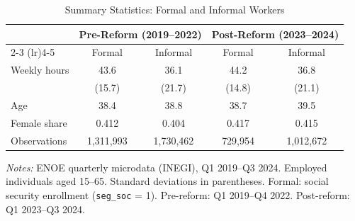 \begin{table}[t]
\centering
\caption{Summary Statistics: Formal and Informal Workers}
\label{tab:summary}
\small
\begin{tabular}{lcccc}
  \toprule
  & \multicolumn{2}{c}{Pre-Reform (2019--2022)} & \multicolumn{2}{c}{Post-Reform (2023--2024)} \\
  \cmidrule(lr){2-3} \cmidrule(lr){4-5}
  & Formal & Informal & Formal & Informal \\
  \midrule
  Weekly hours & 43.6 & 36.1 & 44.2 & 36.8 \\
  & (15.7) & (21.7) & (14.8) & (21.1) \\
  Age & 38.4 & 38.8 & 38.7 & 39.5 \\
  Female share & 0.412 & 0.404 & 0.417 & 0.415 \\
  \midrule
  Observations & 1,311,993 & 1,730,462 & 729,954 & 1,012,672 \\
  \bottomrule
\end{tabular}
\begin{tablenotes}
\small
\item \textit{Notes:} ENOE quarterly microdata (INEGI), Q1 2019--Q3 2024. Employed individuals aged 15--65. Standard deviations in parentheses. Formal: social security enrollment (\texttt{seg\_soc} = 1). Pre-reform: Q1 2019--Q4 2022. Post-reform: Q1 2023--Q3 2024.
\end{tablenotes}
\end{table}
